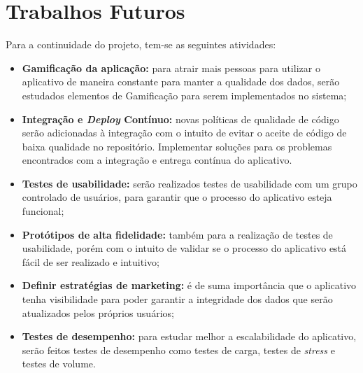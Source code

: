 \section{Trabalhos Futuros}

Para a continuidade do projeto, tem-se as seguintes atividades:

\begin{itemize}
	\item \textbf{Gamificação da aplicação:} para atrair mais pessoas para utilizar o aplicativo de maneira constante para manter a qualidade dos dados, serão estudados elementos de Gamificação para serem implementados no sistema;
    \item \textbf{Integração e \textit{Deploy} Contínuo:} novas políticas de qualidade de código serão adicionadas à integração com o intuito de evitar o aceite de código de baixa qualidade no repositório. Implementar soluções para os problemas encontrados com a integração e entrega contínua do aplicativo.
    \item \textbf{Testes de usabilidade:} serão realizados testes de usabilidade com um grupo controlado de usuários, para garantir que o processo do aplicativo esteja funcional;
    \item \textbf{Protótipos de alta fidelidade:} também para a realização de testes de usabilidade, porém com o intuito de validar se o processo do aplicativo está fácil de ser realizado e intuitivo;
    \item \textbf{Definir estratégias de marketing:} é de suma importância que o aplicativo tenha visibilidade para poder garantir a integridade dos dados que serão atualizados pelos próprios usuários;
    \item \textbf{Testes de desempenho:} para estudar melhor a escalabilidade do aplicativo, serão feitos testes de desempenho como testes de carga, testes de \textit{stress} e testes de volume.
\end{itemize}
